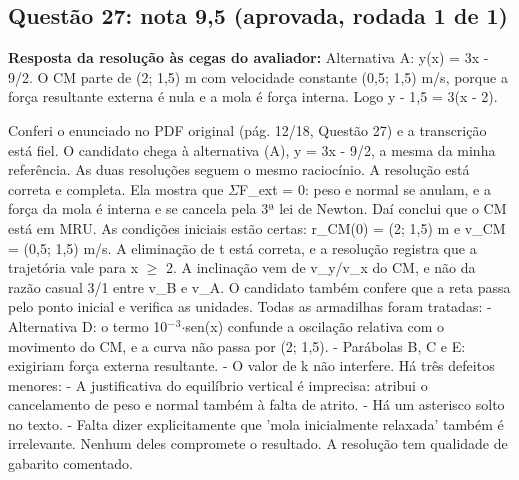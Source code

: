 \documentclass{article}%
\begin{document}
\subsection*{Questão 27: nota 9,5 (aprovada, rodada 1 de 1)}%
\textbf{Resposta da resolução às cegas do avaliador:} Alternativa A: y(x) = 3x - 9/2. O CM parte de (2; 1,5) m com velocidade constante (0,5; 1,5) m/s, porque a força resultante externa é nula e a mola é força interna. Logo y - 1,5 = 3(x - 2).\par %
Conferi o enunciado no PDF original (pág. 12/18, Questão 27) e a transcrição está fiel. O candidato chega à alternativa (A), y = 3x - 9/2, a mesma da minha referência. As duas resoluções seguem o mesmo raciocínio.\newline%
\newline%
A resolução está correta e completa. Ela mostra que $\Sigma$F\_ext = 0: peso e normal se anulam, e a força da mola é interna e se cancela pela 3ª lei de Newton. Daí conclui que o CM está em MRU.\newline%
\newline%
As condições iniciais estão certas: r\_CM(0) = (2; 1,5) m e v\_CM = (0,5; 1,5) m/s. A eliminação de t está correta, e a resolução registra que a trajetória vale para x $\geq$ 2. A inclinação vem de v\_y/v\_x do CM, e não da razão casual 3/1 entre v\_B e v\_A. O candidato também confere que a reta passa pelo ponto inicial e verifica as unidades.\newline%
\newline%
Todas as armadilhas foram tratadas:\newline%
{-} Alternativa D: o termo 10$^{-}$$^3$$\cdot$sen(x) confunde a oscilação relativa com o movimento do CM, e a curva não passa por (2; 1,5).\newline%
{-} Parábolas B, C e E: exigiriam força externa resultante.\newline%
{-} O valor de k não interfere.\newline%
\newline%
Há três defeitos menores:\newline%
{-} A justificativa do equilíbrio vertical é imprecisa: atribui o cancelamento de peso e normal também à falta de atrito.\newline%
{-} Há um asterisco solto no texto.\newline%
{-} Falta dizer explicitamente que 'mola inicialmente relaxada' também é irrelevante.\newline%
\newline%
Nenhum deles compromete o resultado. A resolução tem qualidade de gabarito comentado.%
\end{document}

